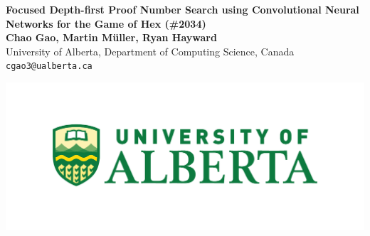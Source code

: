 \documentclass[a0,portrait]{a0poster}
\begin{document}


\begin{minipage}[b]{0.78\linewidth}
\Huge \color{NavyBlue} \textbf{Focused Depth-first Proof Number Search using
Convolutional Neural Networks for the Game of
Hex (\#2034)} \color{Black}\\ %
\huge \textbf{Chao Gao, Martin M\"{u}ller, Ryan Hayward}\\[0.5cm] %
\huge University of Alberta, Department of Computing Science, Canada\\[0.4cm] %
\Large \texttt{cgao3@ualberta.ca} \\
\end{minipage}
%
\begin{minipage}[b]{0.2\linewidth}
\includegraphics[width=14cm]{ua_logo.pdf}\\
\end{minipage}

\vspace{1cm} %

\end{document}
